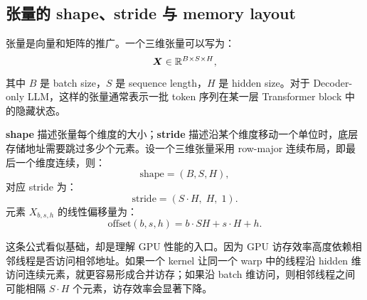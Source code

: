 \subsection{张量的 shape、stride 与 memory layout}
\label{subsec:tensor-shape-stride-layout}

张量是向量和矩阵的推广。一个三维张量可以写为：
\[
  \bm{X}\in\mathbb{R}^{B\times S\times H},
\]
其中 $B$ 是 batch size，$S$ 是 sequence length，$H$ 是 hidden size。对于 Decoder-only LLM，这样的张量通常表示一批 token 序列在某一层 Transformer block 中的隐藏状态。

\textbf{shape} 描述张量每个维度的大小；\textbf{stride} 描述沿某个维度移动一个单位时，底层存储地址需要跳过多少个元素。设一个三维张量采用 row-major 连续布局，即最后一个维度连续，则：
\[
  \mathrm{shape}=(B,S,H),
\]
对应 stride 为：
\[
  \mathrm{stride}=(S\cdot H,\;H,\;1).
\]
元素 $X_{b,s,h}$ 的线性偏移量为：
\[
  \mathrm{offset}(b,s,h)=b\cdot S H+s\cdot H+h.
\]

这条公式看似基础，却是理解 GPU 性能的入口。因为 GPU 访存效率高度依赖相邻线程是否访问相邻地址。如果一个 kernel 让同一个 warp 中的线程沿 hidden 维访问连续元素，就更容易形成合并访存；如果沿 batch 维访问，则相邻线程之间可能相隔 $S\cdot H$ 个元素，访存效率会显著下降。

